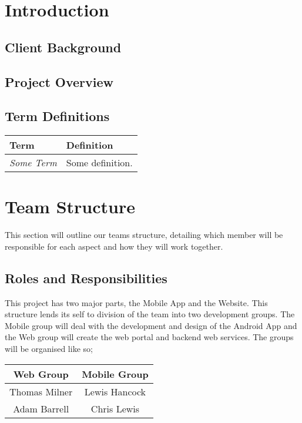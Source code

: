 \documentclass[11pt,a4paper]{article}
\begin{document}


\tableofcontents

\section{Introduction}

\subsection{Client Background}

\subsection{Project Overview}
\label{sec:project-overview}

\subsection{Term Definitions}
\label{sec:terms}

\begin{tabular}{|p{2.5cm}p{13cm}|}
\hline 
\textbf{Term} & \textbf{Definition} \\
\hline \hline
\emph{Some Term} & Some definition.\\
\hline
\end{tabular}

\newpage



\section{Team Structure}
\label{sec:team-structure}
This section will outline our teams structure, detailing which member will be responsible for each aspect and how they will work together. 

\subsection{Roles and Responsibilities}
This project has two major parts, the Mobile App and the Website. This structure lends its self to division of the team into two development groups. The Mobile group will deal with the development and design of the Android App and the Web group will create the web portal and backend web services. The groups will be organised like so;  
\begin{table}[h]
\begin{center}
\begin{tabular}{|c|c|}
\hline
\textbf{Web Group} & \textbf{Mobile Group} \\
\hline
Thomas Milner & Lewis Hancock \\\hline
Adam Barrell & Chris Lewis \\ \hline
\end{tabular}
\end{center}
\end{table}%
\end{document}
